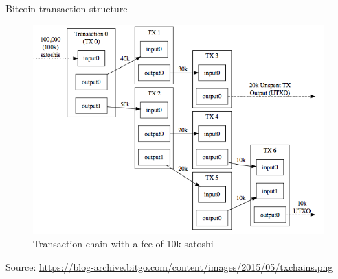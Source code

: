 \documentclass[10pt]{beamer}
\begin{document}
\begin{frame}{Bitcoin transaction structure}
	\begin{figure}[]
		\centering
		\includegraphics  [scale=0.4]{Images/tx-chain}
		\caption{Transaction chain with a fee of 10k satoshi}
	\end{figure}
	\begin{tiny}
		Source: \href{https://blog-archive.bitgo.com/the-challenges-of-block-chain-indexing/}{https://blog-archive.bitgo.com/content/images/2015/05/txchains.png}
	\end{tiny}
\end{frame}



\end{document}
